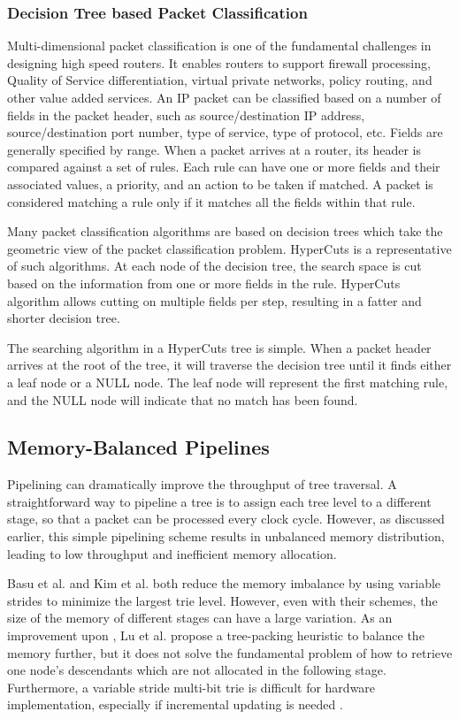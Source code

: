 \documentclass{sigcomm-alternate}
\begin{document}
\subsubsection{Decision Tree based Packet Classification}
Multi-dimensional packet classification is one of the fundamental challenges in designing high speed routers. It enables routers to support firewall processing, Quality of Service differentiation, virtual private networks, policy routing, and other value added services. An IP packet can be classified based on a number of fields in the packet header, such as source/destination IP address, source/destination port number, type of service, type of protocol, etc. Fields are generally specified by range. When a packet arrives at a router, its header is compared against a set of rules. Each rule can have one or more fields and their associated values, a priority, and an action to be taken if matched. A packet is considered matching a rule only if it matches all the fields within that rule.

Many packet classification algorithms are based on decision trees which take the geometric view of the packet classification problem. HyperCuts \cite{sigcomm03:singh} is a representative of such algorithms. At each node of the decision tree, the search space is cut based on the information from one or more fields in the rule. HyperCuts algorithm allows cutting on multiple fields per step, resulting in a fatter and shorter decision tree.

The searching algorithm in a HyperCuts tree is simple. When a packet header arrives at the root of the tree, it will traverse the decision tree until it finds either a leaf node or a NULL node. The leaf node will represent the first matching rule, and the NULL node will indicate that no match has been found.



\subsection{Memory-Balanced Pipelines}

Pipelining can dramatically improve the throughput of tree traversal. A straightforward way to pipeline a tree is to assign each tree level to a different stage, so that a packet can be processed every clock cycle. However, as discussed earlier, this simple pipelining scheme results in unbalanced memory distribution, leading to low throughput and inefficient memory allocation. 

Basu et al. \cite{infocom03:basu} and Kim et al. \cite{toc07:kim} both reduce the memory imbalance by using variable strides to minimize the largest trie level. However, even with their schemes, the size of the memory of different stages can have a large variation. As an improvement upon \cite{toc07:kim}, Lu et al. \cite{iscc06:lu} propose a tree-packing heuristic to balance the memory further, but it does not solve the fundamental problem of how to retrieve one node's descendants which are not allocated in the following stage. Furthermore, a variable stride multi-bit trie is difficult for hardware implementation, especially if incremental updating is needed \cite{infocom03:basu}.
\end{document}
